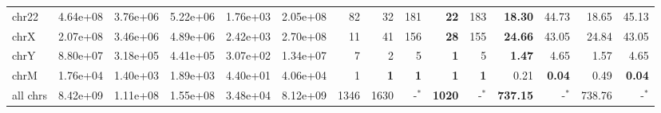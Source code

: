 \begin{table*}[!ht]
\begin{tabular}{@{}lrrrrrrrrrrrrrr@{}}
		chr22 & 4.64e+08 & 3.76e+06 & 5.22e+06 & 1.76e+03 & 2.05e+08 & 82 & 32 & 181 & \textbf{22} & 183 & \textbf{18.30} & 44.73 & 18.65 & 45.13 \\ 
		chrX & 2.07e+08 & 3.46e+06 & 4.89e+06 & 2.42e+03 & 2.70e+08 & 11 & 41 & 156 & \textbf{28} & 155 & \textbf{24.66} & 43.05 & 24.84 & 43.05 \\ 
		chrY & 8.80e+07 & 3.18e+05 & 4.41e+05 & 3.07e+02 & 1.34e+07 & 7 & 2 & 5 & \textbf{1} & 5 & \textbf{1.47} & 4.65 & 1.57 & 4.65 \\ 
		chrM & 1.76e+04 & 1.40e+03 & 1.89e+03 & 4.40e+01 & 4.06e+04 & 1 & \textbf{1} & \textbf{1} & \textbf{1} & \textbf{1} & 0.21 & \textbf{0.04} & 0.49 & \textbf{0.04}  \\ 
		all chrs & 8.42e+09 & 1.11e+08 & 1.55e+08 & 3.48e+04 & 8.12e+09 & 1346 & 1630 & -$^{*}$ & \textbf{1020} & -$^{*}$  & \textbf{737.15} & -$^{*}$ & 738.76 & -$^{*}$ \\
		\bottomrule
	\end{tabular}
\end{table*}
